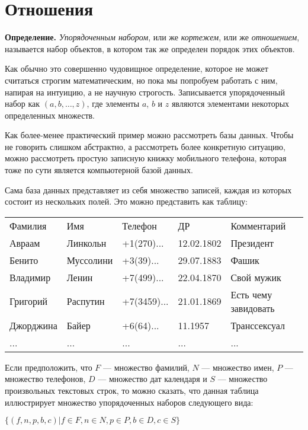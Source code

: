 \section{Отношения}

{\bfseries Определение.} {\slshape Упорядоченным набором}, или же {\slshape кортежем}, или же {\slshape отношением}, называется набор объектов, в котором так же определен порядок этих объектов.

Как обычно это совершенно чудовищное определение, которое не может считаться строгим математическим, но пока мы попробуем работать с ним, напирая на интуицию, а не научную строгость. Записывается упорядоченный набор как $(a, b, \ldots, z)$, где элементы $a$, $b$ и $z$ являются элементами некоторых определенных множеств.

Как более-менее практический пример можно рассмотреть базы данных. Чтобы не говорить слишком абстрактно, а рассмотреть более конкретную ситуацию, можно рассмотреть простую записную книжку мобильного телефона, которая тоже по сути является компьютерной базой данных.

Сама база данных представляет из себя множество записей, каждая из которых состоит из нескольких полей. Это можно представить как таблицу:

\begin{table}[h]
\begin{tabular}{lllll}
Фамилия & Имя & Телефон & ДР & Комментарий\\
Авраам & Линкольн & +1(270)... & 12.02.1802 & Президент\\
Бенито & Муссолини & +3(39)... & 29.07.1883 & Фашик\\
Владимир & Ленин & +7(499)... & 22.04.1870 & Свой мужик\\
Григорий & Распутин & +7(3459)... & 21.01.1869 & Есть чему завидовать\\
Джорджина & Байер & +6(64)... & 11.1957 & Транссексуал\\
... & ... & ... & ... & ...
\end{tabular}
\end{table}

Если предположить, что $F$ — множество фамилий, $N$ — множество имен, $P$ — множество телефонов, $D$ — множество дат календаря и $S$ — множество произвольных текстовых строк, то можно сказать, что данная таблица иллюстрирует множество упорядоченных наборов следующего вида:

$\{(f, n, p, b, c)|f\in F, n \in N, p \in P, b \in D, c \in S\}$

